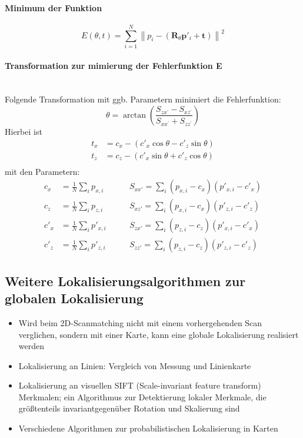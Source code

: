 \paragraph{Minimum der Funktion}
$$
	E(\theta, t)=\sum_{i=1}^N \left\| p_i - \left( \boldsymbol R_\theta
		\boldsymbol p'_i + \boldsymbol t \right) \right\| ^2
$$

\paragraph{Transformation zur mimierung der Fehlerfunktion E} \hfill \\
Folgende Transformation mit ggb. Parametern minimiert die Fehlerfunktion:
$$
	\theta=\arctan \left(\frac{S_{z x^{\prime}}-S_{x z^{\prime}}}{S_{x
		x^{\prime}}+S_{z z^{\prime}}}\right)
$$
Hierbei ist
\begin{align*}
	t_x &= c_x - \left( c'_x \cos\theta - c'_z \sin\theta \right) \\
	t_z &= c_z - \left( c'_x \sin\theta + c'_z \cos\theta \right) \\
\end{align*}
mit den Parametern:
\begin{align*}
	c_x &= \frac1N \sum_i p_{x,i} \qquad & S_{xx'} = \sum_i (p_{x,i} - c_x)
		(p'_{x,i} - c'_x) \\
	c_z &= \frac1N \sum_i p_{z,i} \qquad & S_{xz'} = \sum_i (p_{x,i} - c_x)
		(p'_{z,i} - c'_z) \\
	c'_x &= \frac1N \sum_i p'_{x,i} \qquad & S_{zx'} = \sum_i (p_{z,i} - c_z)
		(p'_{x,i} - c'_x) \\
	c'_z &= \frac1N \sum_i p'_{z,i} \qquad & S_{zz'} = \sum_i (p_{z,i} - c_z)
		(p'_{z,i} - c'_z)
\end{align*}

\subsection{Weitere Lokalisierungsalgorithmen zur globalen Lokalisierung}
\begin{itemize}
	\item Wird beim 2D-Scanmatching nicht mit einem vorhergehenden Scan
		verglichen, sondern mit einer Karte, kann eine globale Lokalisierung
		realisiert werden
	\item Lokalisierung an Linien: Vergleich von Messung und Linienkarte
	\item Lokalisierung an visuellen SIFT (Scale-invariant feature transform)
		Merkmalen; ein Algorithmus zur Detektierung lokaler Merkmale, die
		größtenteils invariantgegenüber Rotation und Skalierung sind
	\item Verschiedene Algorithmen zur probabilistischen Lokalisierung in Karten
\end{itemize}
